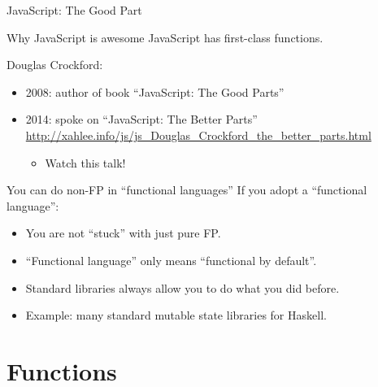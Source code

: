 \begin{frame}{JavaScript: The Good Part}
  \begin{block}{Why JavaScript is awesome}
    JavaScript has first-class functions.
  \end{block}

  Douglas Crockford:
  \begin{itemize}
  \item 2008: author of book ``JavaScript: The Good Parts''
  \item 2014: spoke on ``JavaScript: The Better Parts''
    \url{http://xahlee.info/js/js_Douglas_Crockford_the_better_parts.html}
    \begin{itemize}
    \item Watch this talk!
    \end{itemize}
  \end{itemize}
\end{frame}

\begin{frame}{You can do non-FP in ``functional languages''}
  If you adopt a ``functional language'':
  \begin{itemize}
  \item You are not ``stuck'' with just pure FP.
  \item ``Functional language'' only means ``functional by default''.
  \item Standard libraries always allow you to do what you did before.
  \item Example: many standard mutable state libraries for Haskell.
  \end{itemize}
\end{frame}

\section{Functions}


